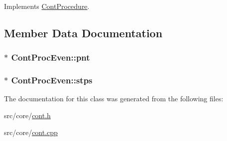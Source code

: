 Implements \hyperlink{a00067_a7f7adefe250a00b3778669ef649f03ac}{Cont\-Procedure}.



\subsection{Member Data Documentation}
\hypertarget{a00068_a5f29bd5f2ada87f5b657f8494ed36afa}{
\subsubsection[{pnt}]{$\ast$ Cont\-Proc\-Even\-::pnt\hspace{0.3cm}{\ttfamily [private]}}}\label{a00068_a5f29bd5f2ada87f5b657f8494ed36afa}
\hypertarget{a00068_aa05efb6bad22228ea0d6e7234f2f7b4f}{
\subsubsection[{stps}]{$\ast$ Cont\-Proc\-Even\-::stps\hspace{0.3cm}{\ttfamily [private]}}}\label{a00068_aa05efb6bad22228ea0d6e7234f2f7b4f}


The documentation for this class was generated from the following files\-:\begin{DoxyCompactItemize}
\item 
src/core/\hyperlink{a00218}{cont.\-h}\item 
src/core/\hyperlink{a00217}{cont.\-cpp}\end{DoxyCompactItemize}
